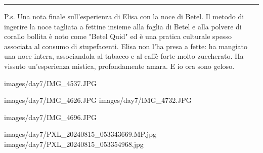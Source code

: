 \begin{center}
    \noindent\rule{0.6\textwidth}{0.4pt}
\end{center}

P.s. Una nota finale sull'esperienza di Elisa con la noce di Betel. Il metodo di ingerire la noce tagliata a fettine insieme alla foglia di Betel e alla polvere di corallo bollita è noto come "Betel Quid" ed è una pratica culturale spesso associata al consumo di stupefacenti. Elisa non l'ha presa a fette: ha mangiato una noce intera, associandola al tabacco e al caffè forte molto zuccherato. Ha vissuto un'esperienza mistica, profondamente amara. E io ora sono geloso.


\pagestyle{empty} %


                      {images/day7/IMG_4537.JPG}
%

                      {images/day7/IMG_4626.JPG}
                      {images/day7/IMG_4732.JPG}
%

                      {images/day7/IMG_4696.JPG}
%

                        {images/day7/PXL_20240815_053343669.MP.jpg}
                        {images/day7/PXL_20240815_053354968.jpg}
%

%



%

